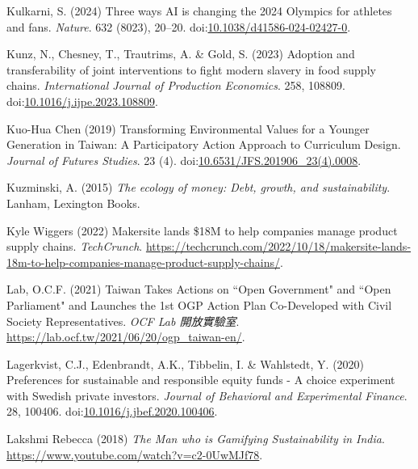 \documentclass[
  letterpaper,
  DIV=11,
  numbers=noendperiod]{scrartcl}
\newlength{\cslhangindent}
\newenvironment{CSLReferences}[2] %
 {\begin{list}{}{%
  \setlength{\itemindent}{0pt}
  \setlength{\leftmargin}{0pt}
  \setlength{\parsep}{0pt}
  \ifodd #1
   \setlength{\leftmargin}{\cslhangindent}
   \setlength{\itemindent}{-1\cslhangindent}
  \fi
  \setlength{\itemsep}{#2\baselineskip}}}
 {\end{list}}
\begin{document}
\begin{CSLReferences}{0}{1}
Kulkarni, S. (2024) Three ways {AI} is changing the 2024 {Olympics} for
athletes and fans. \emph{Nature}. 632 (8023), 20--20.
doi:\href{https://doi.org/10.1038/d41586-024-02427-0}{10.1038/d41586-024-02427-0}.

Kunz, N., Chesney, T., Trautrims, A. \& Gold, S. (2023) Adoption and
transferability of joint interventions to fight modern slavery in food
supply chains. \emph{International Journal of Production Economics}.
258, 108809.
doi:\href{https://doi.org/10.1016/j.ijpe.2023.108809}{10.1016/j.ijpe.2023.108809}.

Kuo-Hua Chen (2019) Transforming {Environmental Values} for a {Younger
Generation} in {Taiwan}: {A Participatory Action Approach} to
{Curriculum Design}. \emph{Journal of Futures Studies}. 23 (4).
doi:\href{https://doi.org/10.6531/JFS.201906_23(4).0008}{10.6531/JFS.201906\_23(4).0008}.

Kuzminski, A. (2015) \emph{The ecology of money: Debt, growth, and
sustainability}. Lanham, Lexington Books.

Kyle Wiggers (2022) Makersite lands \${18M} to help companies manage
product supply chains. \emph{TechCrunch}.
\url{https://techcrunch.com/2022/10/18/makersite-lands-18m-to-help-companies-manage-product-supply-chains/}.

Lab, O.C.F. (2021) {Taiwan Takes Actions on ``Open Government" and
``Open Parliament" and Launches the 1st OGP Action Plan Co-Developed
with Civil Society Representatives}. \emph{OCF Lab 開放實驗室}.
\url{https://lab.ocf.tw/2021/06/20/ogp_taiwan-en/}.

Lagerkvist, C.J., Edenbrandt, A.K., Tibbelin, I. \& Wahlstedt, Y. (2020)
Preferences for sustainable and responsible equity funds - {A} choice
experiment with {Swedish} private investors. \emph{Journal of Behavioral
and Experimental Finance}. 28, 100406.
doi:\href{https://doi.org/10.1016/j.jbef.2020.100406}{10.1016/j.jbef.2020.100406}.

Lakshmi Rebecca (2018) \emph{The {Man} who is {Gamifying Sustainability}
in {India}}. \url{https://www.youtube.com/watch?v=c2-0UwMJf78}.


\end{CSLReferences}
\end{document}
